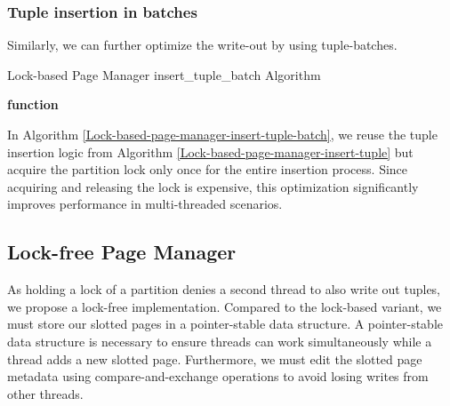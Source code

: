 \subsubsection*{Tuple insertion in batches}
Similarly, we can further optimize the write-out by using tuple-batches.
\begin{algorithm}[h]
  \caption{Lock-based Page Manager insert\_tuple\_batch Algorithm}\label{Lock-based-page-manager-insert-tuple-batch}


  \textbf{function} \end{algorithm} In Algorithm \ref{Lock-based-page-manager-insert-tuple-batch}, we reuse the tuple insertion logic from Algorithm \ref{Lock-based-page-manager-insert-tuple} but acquire the partition lock only once for the entire insertion process.
Since acquiring and releasing the lock is expensive, this optimization significantly improves performance in multi-threaded scenarios.

\subsection{Lock-free Page Manager}
As holding a lock of a partition denies a second thread to also write out tuples, we propose a lock-free implementation.
Compared to the lock-based variant, we must store our slotted pages in a pointer-stable data structure.
A pointer-stable data structure is necessary to ensure threads can work simultaneously while a thread adds a new slotted page.
Furthermore, we must edit the slotted page metadata using compare-and-exchange operations to avoid losing writes from other threads.

